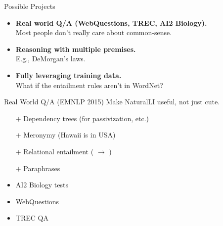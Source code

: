 \begin{frame}{}

\begin{center}
\huge{}
\end{center}

\end{frame}


\begin{frame}{Possible Projects}
\pause
\begin{itemize}
  \item \textbf{Real world Q/A (WebQuestions, TREC, AI2 Biology).} \\
        Most people don't really care about common-sense.
  \pause
  \vspace{1em}
  \item \textbf{Reasoning with multiple premises.} \\
        E.g., DeMorgan's laws.
  \pause
  \vspace{1em}
  \item \textbf{Fully leveraging training data.} \\
        What if the entailment rules aren't in WordNet?
\end{itemize}
\end{frame}


\begin{frame}{Real World Q/A (EMNLP 2015)}
 Make NaturalLI useful, not just cute.
\vspace{1em}
\pause

\begin{itemize}
  \item[$+$] Dependency trees (for passivization, etc.)
  \item[$+$] Meronymy (Hawaii is in USA)
  \item[$+$] Relational entailment ( $\rightarrow$ )
  \item[$+$] Paraphrases
\end{itemize}
\pause
\vspace{1em}

\begin{itemize}
  \item AI2 Biology tests
  \item WebQuestions
  \item TREC QA
\end{itemize}
\end{frame}


